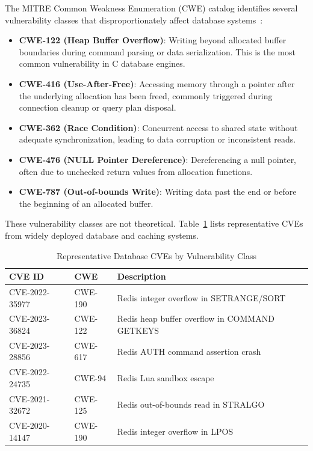 \documentclass[conference,a4paper]{IEEEtran}
\begin{document}
The MITRE Common Weakness Enumeration (CWE) catalog identifies several vulnerability classes that disproportionately affect database systems~\cite{cwe2024}:

\begin{itemize}
    \item \textbf{CWE-122 (Heap Buffer Overflow)}: Writing beyond allocated buffer boundaries during command parsing or data serialization. This is the most common vulnerability in C database engines.
    \item \textbf{CWE-416 (Use-After-Free)}: Accessing memory through a pointer after the underlying allocation has been freed, commonly triggered during connection cleanup or query plan disposal.
    \item \textbf{CWE-362 (Race Condition)}: Concurrent access to shared state without adequate synchronization, leading to data corruption or inconsistent reads.
    \item \textbf{CWE-476 (NULL Pointer Dereference)}: Dereferencing a null pointer, often due to unchecked return values from allocation functions.
    \item \textbf{CWE-787 (Out-of-bounds Write)}: Writing data past the end or before the beginning of an allocated buffer.
\end{itemize}

These vulnerability classes are not theoretical. Table~\ref{tab:cve_examples} lists representative CVEs from widely deployed database and caching systems.

\begin{table}[htbp]
\caption{Representative Database CVEs by Vulnerability Class}
\label{tab:cve_examples}
\centering
\begin{tabular}{@{}llp{4cm}@{}}
\toprule
\textbf{CVE ID} & \textbf{CWE} & \textbf{Description} \\
\midrule
CVE-2022-35977 & CWE-190 & Redis integer overflow in SETRANGE/SORT \\
CVE-2023-36824 & CWE-122 & Redis heap buffer overflow in COMMAND GETKEYS \\
CVE-2023-28856 & CWE-617 & Redis AUTH command assertion crash \\
CVE-2022-24735 & CWE-94  & Redis Lua sandbox escape \\
CVE-2021-32672 & CWE-125 & Redis out-of-bounds read in STRALGO \\
CVE-2020-14147 & CWE-190 & Redis integer overflow in LPOS \\
\bottomrule
\end{tabular}
\end{table}
\end{document}
